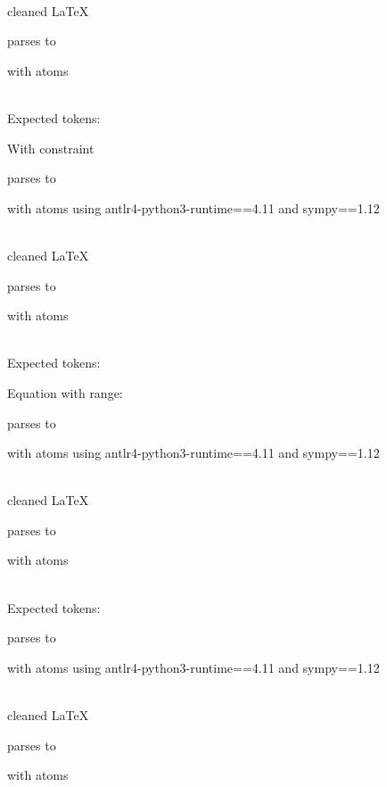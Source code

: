 \documentclass{article}
\begin{document}
\ \\
cleaned \LaTeX

parses to

with atoms


\ \\
Expected tokens:



\hrulefill


With constraint

parses to

with atoms
using antlr4-python3-runtime==4.11 and sympy==1.12

\ \\
cleaned \LaTeX

parses to

with atoms


\ \\
Expected tokens:



\hrulefill


Equation with range:

parses to

with atoms
using antlr4-python3-runtime==4.11 and sympy==1.12

\ \\
cleaned \LaTeX

parses to

with atoms


\ \\
Expected tokens:


\hrulefill



parses to

with atoms
using antlr4-python3-runtime==4.11 and sympy==1.12

\ \\
cleaned \LaTeX

parses to

with atoms

\end{document}
